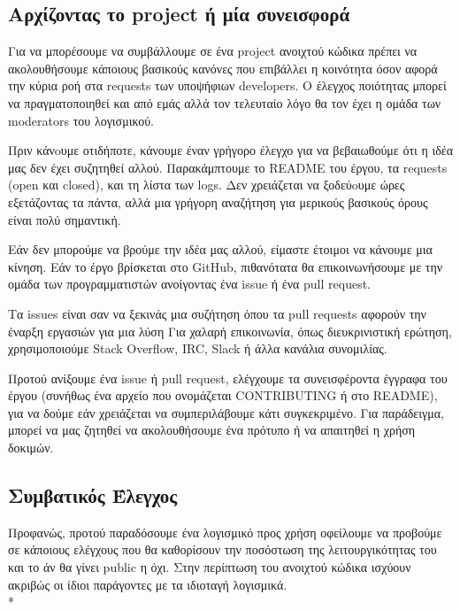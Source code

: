 \documentclass[a4paper, 11pt]{article}
\begin{document}
{{\subsection{Αρχίζοντας το \textlatin{project} ή μία συνεισφορά}
Για να μπορέσουμε να συμβάλλουμε σε ένα project ανοιχτού κώδικα πρέπει να ακολουθήσουμε κάποιους βασικούς κανόνες που επιβάλλει η κοινότητα όσον αφορά την κύρια ροή στα \textlatin{requests} των υποψήφιων \textlatin{developers}. Ο έλεγχος ποιότητας μπορεί να πραγματοποιηθεί και από εμάς αλλά τον τελευταίο λόγο θα τον έχει η ομάδα των \textlatin{moderators} του λογισμικού.

Πριν κάνoυμε οτιδήποτε, κάνουμε έναν γρήγορο έλεγχο για να βεβαιωθούμε ότι η ιδέα μας δεν έχει συζητηθεί αλλού. Παρακάμπτουμε το \textlatin{README} του έργου, τα \textlatin{requests (open και closed)}, και τη λίστα των \textlatin{logs}. Δεν χρειάζεται να ξοδεύoυμε ώρες εξετάζοντας τα πάντα, αλλά μια γρήγορη αναζήτηση για μερικούς βασικούς όρους είναι πολύ σημαντική.

Εάν δεν μπορούμε να βρούμε την ιδέα μας αλλού, είμαστε έτοιμοι να κάνουμε μια κίνηση. Εάν το έργο βρίσκεται στο \textlatin{GitHub}, πιθανότατα θα επικοινωνήσουμε με την ομάδα των προγραμματιστών  ανοίγοντας ένα issue ή ένα pull request.

    Τα issues είναι σαν να ξεκινάς μια συζήτηση όπου
    τα \textlatin{pull requests}  αφορούν την έναρξη εργασιών για μια λύση
    Για χαλαρή επικοινωνία, όπως διευκρινιστική ερώτηση, χρησιμοποιούμε  \textlatin{Stack Overflow, IRC, Slack ή άλλα κανάλια συνομιλίας}.

Προτού ανίξουμε ένα \textlatin{issue} ή \textlatin{pull request}, ελέγχουμε τα συνεισφέροντα έγγραφα του έργου (συνήθως ένα αρχείο που ονομάζεται \textlatin{CONTRIBUTING} ή στο \textlatin{README}), για να δούμε εάν χρειάζεται να συμπεριλάβουμε κάτι συγκεκριμένο. Για παράδειγμα, μπορεί να μας ζητηθεί να ακολουθήσουμε ένα πρότυπο ή να απαιτηθεί η χρήση δοκιμών.

\subsection{Συμβατικός Έλεγχος}
Προφανώς, προτού παραδόσουμε ένα λογισμικό προς χρήση οφείλουμε να προβούμε σε κάποιους ελέγχους που θα καθορίσουν την ποσόστωση της λειτουργικότητας του και το άν θα γίνει \textlatin{public} η όχι. Στην περίπτωση του ανοιχτού κώδικα ισχύουν ακριβώς οι ίδιοι παράγοντες με τα ιδιοταγή λογισμικά.\\*

}}
\end{document}
